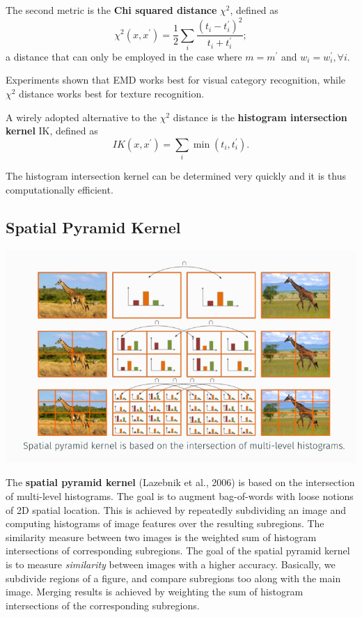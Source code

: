 \documentclass[10pt]{report}
\begin{document}
The second metric is the \textbf{Chi squared distance} \(\chi^2\), defined as $$\chi^2(x,x^\prime) = \frac 1 2 \sum_i \frac{(t_i - t_i^\prime)^2}{t_i + t_i^\prime};$$ a distance that can only be employed in the case where \(m = m^\prime\) and \(w_i = w_i^\prime, \forall i\).

Experiments shown that EMD works best for visual category recognition, while \(\chi^2\) distance works best for texture recognition.

A wirely adopted alternative to the \(\chi^2\) distance is the \textbf{histogram intersection kernel} IK, defined as $$IK(x,x^\prime) = \sum_i \min(t_i,t_i^\prime).$$

The histogram intersection kernel can be determined very quickly and it is thus computationally efficient.

\subsection{Spatial Pyramid Kernel}
\label{sec:org0b4e973}

\begin{center}
\includegraphics[width=.9\linewidth]{./pics/recog/spatial-pyramid-kernel.jpg}
\end{center}

The \textbf{spatial pyramid kernel} (Lazebnik et al., 2006) is based on the
intersection of multi-level histograms. The goal is to augment
bag-of-words with loose notions of 2D spatial location. This is achieved
by repeatedly subdividing an image and computing histograms of image
features over the resulting subregions. The similarity measure between
two images is the weighted sum of histogram intersections of
corresponding subregions. The goal of the spatial pyramid kernel is to
measure \emph{similarity} between images with a higher accuracy. Basically,
we subdivide regions of a figure, and compare subregions too along with
the main image. Merging results is achieved by weighting the sum of
histogram intersections of the corresponding subregions.
\end{document}
